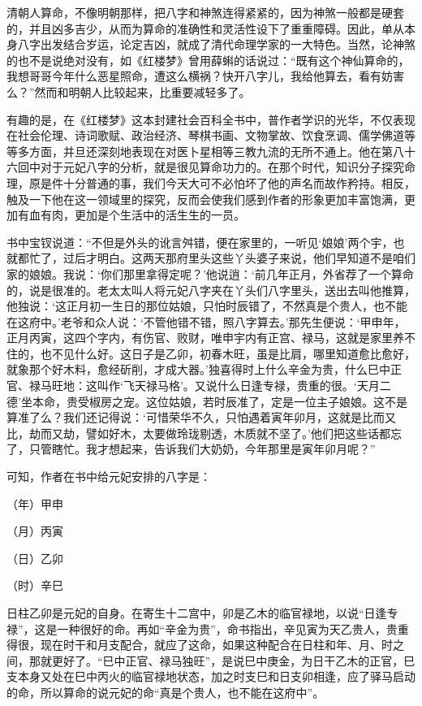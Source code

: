 \documentclass[a5paper,oneside,12pt]{ctexbook}
\begin{document}
清朝人算命，不像明朝那样，把八字和神煞连得紧紧的，因为神煞一般都是硬套的，并且凶多吉少，从而为算命的准确性和灵活性设下了重重障碍。因此，单从本身八字出发结合岁运，论定吉凶，就成了清代命理学家的一大特色。当然，论神煞的也不是说绝对没有，如《红楼梦》曾用薛蝌的话说过：“既有这个神仙算命的，我想哥哥今年什么恶星照命，遭这么横祸？快开八字儿，我给他算去，看有妨害么？”然而和明朝人比较起来，比重要减轻多了。

有趣的是，在《红楼梦》这本封建社会百科全书中，普作者学识的光华，不仅表现在社会伦理、诗词歌赋、政治经济、琴棋书画、文物掌故、饮食烹调、儒学佛道等等多方面，并旦还深刻地表现在对医卜星相等三教九流的无所不通上。他在第八十六回中对于元妃八字的分析，就是很见算命功力的。在那个时代，知识分子探究命理，原是件十分普通的事，我们今天大可不必怕坏了他的声名而故作矜持。相反，触及一下他在这一领域里的探究，反而会使我们感到作者的形象更加丰富饱满，更加有血有肉，更加是个生活中的活生生的一员。

书中宝钗说道：“不但是外头的讹言舛错，便在家里的，一听见‘娘娘’两个宇，也就都忙了，过后才明白。这两天那府里头这些丫头婆子来说，他们早知道不是咱们家的娘娘。我说：‘你们那里拿得定呢？’他说逍：‘前几年正月，外省荐了一个算命的，说是很准的。老太太叫人将元妃八字夹在丫头们八字里头，送出去叫他推算，他独说：‘这正月初一生日的那位姑娘，只怕时辰错了，不然真是个贵人，也不能在这府中。’老爷和众人说：‘不管他错不错，照八字算去。’那先生便说：‘甲申年，正月丙寅，这四个字内，有伤官、败财，唯申宇内有正宫、禄马，这就是家里养不住的，也不见什么好。这日子是乙卯，初春木旺，虽是比肩，哪里知道愈比愈好，就象那个好木料，愈经斫削，才成大器。’独喜得时上什么辛金为贵，什么巳中正官、禄马旺地：这叫作‘飞天禄马格’。又说什么日逢专禄，贵重的很。‘天月二德’坐本命，贵受椒房之宠。这位姑娘，若时辰准了，定是一位主子娘娘。这不是算准了么？我们还记得说：‘可惜荣华不久，只怕遇着寅年卯月，这就是比而又比，劫而又劫，譬如好木，太要做玲珑剔透，木质就不坚了。’他们把这些话都忘了，只管瞎忙。我才想起来，告诉我们大奶奶，今年那里是寅年卯月呢？”

可知，作者在书中给元妃安排的八字是：

（年）甲申\par
（月）丙寅\par
（日）乙卯\par
（时）辛巳

日柱乙卯是元妃的自身。在寄生十二宫中，卯是乙木的临官禄地，以说“日逢专禄”，这是一种很好的命。再如“辛金为贵”，命书指出，辛见寅为天乙贵人，贵重得很，现在时干和月支配合，就应了这命，如果这种配合在日柱和年、月、时之间，那就更好了。“巳中正官、禄马独旺”，是说巳中庚金，为日干乙木的正官，巳支本身又处在巳中丙火的临官禄地状态，加之时支巳和日支卯相逢，应了驿马启动的命，所以算命的说元妃的命“真是个贵人，也不能在这府中”。
\end{document}
